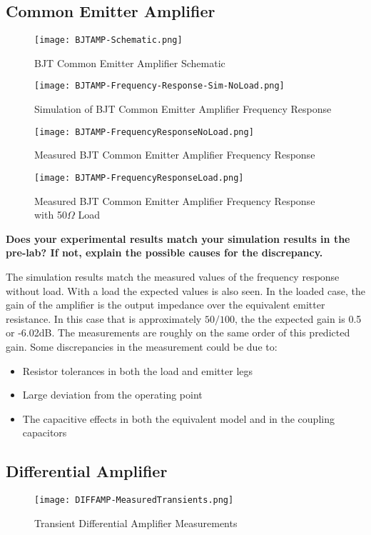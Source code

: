 \documentclass{article}
\begin{document}
\subsection*{Common Emitter Amplifier}
\begin{figure}[H]
  \centering 
  \texttt{[image: BJTAMP-Schematic.png]} 
  \caption{ BJT Common Emitter Amplifier Schematic}
\end{figure}
\begin{figure}[H]
  \centering 
  \texttt{[image: BJTAMP-Frequency-Response-Sim-NoLoad.png]} 
  \caption{Simulation of BJT Common Emitter Amplifier Frequency Response}
\end{figure}
\begin{figure}[H]
  \centering 
  \texttt{[image: BJTAMP-FrequencyResponseNoLoad.png]} 
  \caption{Measured BJT Common Emitter Amplifier Frequency Response}
\end{figure}

\begin{figure}[H]
  \centering 
  \texttt{[image: BJTAMP-FrequencyResponseLoad.png]} 
  \caption{Measured BJT Common Emitter Amplifier Frequency Response with 50$\Omega$ Load}
\end{figure}


\textbf{
 Does your experimental results match your simulation results in the
pre-lab? If not, explain the possible causes for the discrepancy.
}

\vspace{1em}
The simulation results match the measured values of the frequency
response without load. With a load the expected values is also seen.
In the loaded case, the gain of the amplifier is the output impedance over
the equivalent emitter resistance. In this case that is approximately $50/100$,
the the expected gain is 0.5 or -6.02dB. The measurements are roughly on the same 
order of this predicted gain. Some discrepancies in the measurement could be due to:
\begin{itemize}
  \item Resistor tolerances in both the load and emitter legs
  \item Large deviation from the operating point
  \item The capacitive effects in both the equivalent model and in the coupling
  capacitors
\end{itemize}





\subsection*{Differential Amplifier}
\begin{figure}[H]
  \centering 
  \texttt{[image: DIFFAMP-MeasuredTransients.png]} 
  \caption{Transient Differential Amplifier Measurements}
\end{figure}
\end{document}
